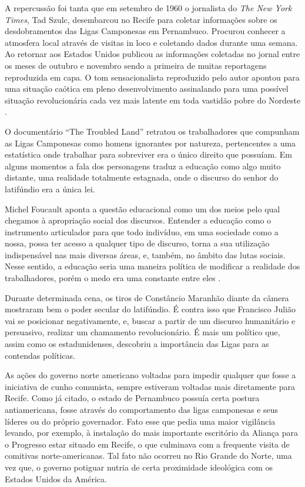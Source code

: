 \begin{refsection}
    A repercussão foi tanta que em setembro de 1960 o jornalista do \textit{The New York Times}, Tad Szulc, desembarcou no Recife para coletar informações sobre os desdobramentos das Ligas Camponesas em Pernambuco. Procurou conhecer a atmosfera local através de visitas in loco e coletando dados durante uma semana. Ao retornar aos Estados Unidos publicou as informações coletadas no jornal entre os meses de outubro e novembro sendo a primeira de muitas reportagens reproduzida em capa. O tom sensacionalista reproduzido pelo autor apontou para uma situação caótica em pleno desenvolvimento assinalando para uma possível situação revolucionária cada vez mais latente em toda vastidão pobre do Nordeste \cite[p.~62]{Barros2017Pobreza}.

    O documentário ``The Troubled Land'' retratou os trabalhadores que compunham as Ligas Camponesas como homens ignorantes por natureza, pertencentes a uma estatística onde trabalhar para sobreviver era o único direito que possuíam. Em alguns momentos a fala dos personagens traduz a educação como algo muito distante, uma realidade totalmente estagnada, onde o discurso do senhor do latifúndio era a única lei.

    Michel Foucault aponta a questão educacional como um dos meios pelo qual chegamos à apropriação social dos discursos. Entender a educação como o instrumento articulador para que todo indivíduo, em uma sociedade como a nossa, possa ter acesso a qualquer tipo de discurso, torna a sua utilização indispensável nas mais diversas áreas, e, também, no âmbito das lutas sociais. Nesse sentido, a educação seria uma maneira política de modificar a realidade dos trabalhadores, porém o medo era uma constante entre eles \cite[p.~43--44]{Foucault2012Ordem}.

    Durante determinada cena, os tiros de Constâncio Maranhão diante da câmera mostraram bem o poder secular do latifúndio. É contra isso que Francisco Julião vai se posicionar negativamente, e, buscar a partir de um discurso humanitário e persuasivo, realizar um chamamento revolucionário. É mais um político que, assim como os estadunidenses, descobriu a importância das Ligas para as contendas políticas.  

    As ações do governo norte americano voltadas para impedir qualquer que fosse a iniciativa de cunho comunista, sempre estiveram voltadas mais diretamente para Recife. Como já citado, o estado de Pernambuco possuía certa postura antiamericana, fosse através do comportamento das ligas camponesas e seus líderes ou do próprio governador. Fato esse que pedia uma maior vigilância levando, por exemplo, à instalação do mais importante escritório da Aliança para o Progresso estar situado em Recife, o que culminava com a frequente visita de comitivas norte-americanas. Tal fato não ocorreu no Rio Grande do Norte, uma vez que, o governo potiguar nutria de certa proximidade ideológica com os Estados Unidos da América.


\end{refsection}
